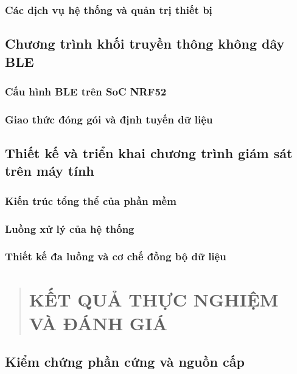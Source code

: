 \documentclass[
  a4paper,
]{report}
\begin{document}
\subsection{Các dịch vụ hệ thống và quản trị thiết bị}

\section{Chương trình khối truyền thông không dây BLE}

\subsection{Cấu hình BLE trên SoC NRF52}

\subsection{Giao thức đóng gói và định tuyến dữ liệu}

\section{Thiết kế và triển khai chương trình giám sát trên máy tính}

\subsection{Kiến trúc tổng thể của phần mềm}

\subsection{Luồng xử lý của hệ thống}

\subsection{Thiết kế đa luồng và cơ chế đồng bộ dữ liệu}

\begin{quote}
\chapter{KẾT QUẢ THỰC NGHIỆM VÀ ĐÁNH GIÁ}
\end{quote}

\section{Kiểm chứng phần cứng và nguồn cấp}
\end{document}
